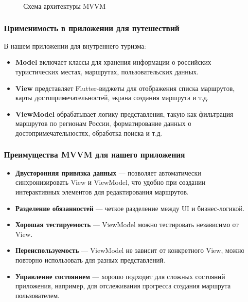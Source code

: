\begin{figure}[H]
\centering
{}
\caption{Схема архитектуры MVVM}
\label{fig:mvvm}
\end{figure}


\subsubsection*{Применимость в приложении для путешествий}

В нашем приложении для внутреннего туризма:

\begin{itemize}
    \item \textbf{Model} включает классы для хранения информации о российских туристических местах, маршрутах, пользовательских данных.
    \item \textbf{View} представляет Flutter-виджеты для отображения списка маршрутов, карты достопримечательностей, экрана создания маршрута и т.д.
    \item \textbf{ViewModel} обрабатывает логику представления, такую как фильтрация маршрутов по регионам России, форматирование данных о достопримечательностях, обработка поиска и т.д.
\end{itemize}

\subsubsection*{Преимущества MVVM для нашего приложения}
\begin{itemize}
    \item \textbf{Двусторонняя привязка данных} — позволяет автоматически синхронизировать View и ViewModel, что удобно при создании интерактивных элементов для редактирования маршрутов.
    \item \textbf{Разделение обязанностей} — четкое разделение между UI и бизнес-логикой.
    \item \textbf{Хорошая тестируемость} — ViewModel можно тестировать независимо от View.
    \item \textbf{Переиспользуемость} — ViewModel не зависит от конкретного View, можно повторно использовать для разных представлений.
    \item \textbf{Управление состоянием} — хорошо подходит для сложных состояний приложения, например, для отслеживания прогресса создания маршрута пользователем.
\end{itemize}


